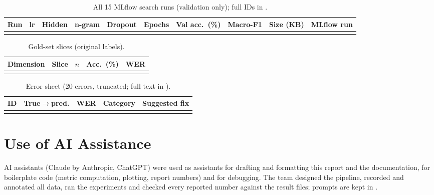 \documentclass[sigconf,authordraft]{acmart}
\begin{document}
\begin{table}[t]
\caption{All 15 MLflow search runs (validation only); full IDs in .}\label{tab:runs}
\begin{tabular}{rrrrrrrrrl}
\toprule Run & lr & Hidden & n-gram & Dropout & Epochs & Val acc.\ (\%) & Macro-F1 & Size (KB) & MLflow run \\ \midrule

\\ \bottomrule
\end{tabular}
\end{table}
\clearpage
\begin{table}[!t]
\caption{Gold-set slices (original labels).}\label{tab:slices}
\begin{tabular}{llrrr}
\toprule Dimension & Slice & $n$ & Acc.\ (\%) & WER \\ \midrule

\\ \bottomrule
\end{tabular}
\end{table}
\begin{table}[t]
\caption{Error sheet (20 errors, truncated; full text in ).}\label{tab:err}
\scriptsize
\begin{tabular}{llrp{4.2cm}p{7.3cm}}
\toprule ID & True$\to$pred. & WER & Category & Suggested fix \\ \midrule

\\ \bottomrule
\end{tabular}
\end{table}
\section{Use of AI Assistance}
AI assistants (Claude by Anthropic, ChatGPT) were used as assistants for drafting and formatting this report and the documentation, for boilerplate code (metric computation, plotting, report numbers) and for debugging. The team designed the pipeline, recorded and annotated all data, ran the experiments and checked every reported number against the result files; prompts are kept in .
\end{document}
